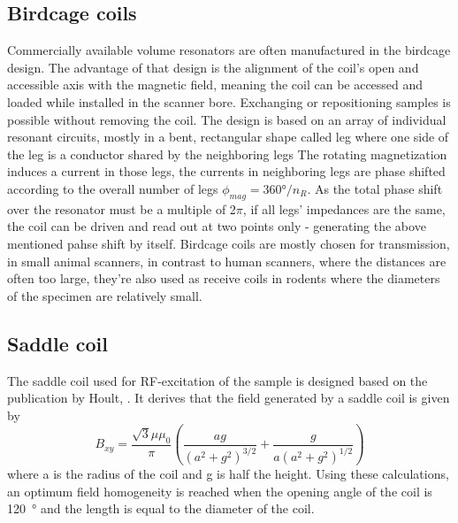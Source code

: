             \subsection{Birdcage coils}
            Commercially available volume resonators are often manufactured in the birdcage design. The advantage of that design is the alignment of the coil's open and accessible axis with the magnetic field, meaning the coil can be accessed and loaded while installed in the scanner bore. Exchanging or repositioning samples is possible without removing the coil. The design is based on an array of individual resonant circuits, mostly in a bent, rectangular shape called leg where one side of the leg is a conductor shared by the neighboring legs The rotating magnetization induces a current in those legs, the currents in neighboring legs are phase shifted according to the overall number of legs $\phi_{mag} = 360\si{\degree}/n_R$. As the total phase shift over the resonator must be a multiple of 2$\pi$, if all legs' impedances are the same, the coil can be driven and read out at two points only - generating the above mentioned pahse shift by itself. Birdcage coils are mostly chosen for transmission, in small animal scanners, in contrast to human scanners, where the distances are often too large, they're also used as receive coils in rodents where the diameters of the specimen are relatively small.
            \subsection{Saddle coil}
            \label{sec:theory:saddleCoils}
            The saddle coil used for RF-excitation of the sample is designed based on the publication by Hoult, \cite{hoult_signal--noise_1976}. It derives that the field generated by a saddle coil is given by
            \begin{equation}
                B_{xy} = \frac{\sqrt 3 \mu\mu_0}{\pi}\left(\frac{ag}{(a^2+g^2)^{3/2}}+\frac{g}{a(a^2+g^2)^{1/2}}\right)
            \end{equation}
            where a is the radius of the coil and g is half the height. Using these calculations, an optimum field homogeneity is reached when the opening angle of the coil is \SI{120}{\degree} and the length is equal to the diameter of the coil.
